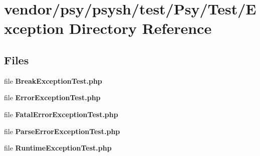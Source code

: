 \section{vendor/psy/psysh/test/\+Psy/\+Test/\+Exception Directory Reference}
\label{dir_197749cacdc66cc6abccfd387c498f27}
\subsection*{Files}
\begin{DoxyCompactItemize}
\item 
file {\bf Break\+Exception\+Test.\+php}
\item 
file {\bf Error\+Exception\+Test.\+php}
\item 
file {\bf Fatal\+Error\+Exception\+Test.\+php}
\item 
file {\bf Parse\+Error\+Exception\+Test.\+php}
\item 
file {\bf Runtime\+Exception\+Test.\+php}
\end{DoxyCompactItemize}
